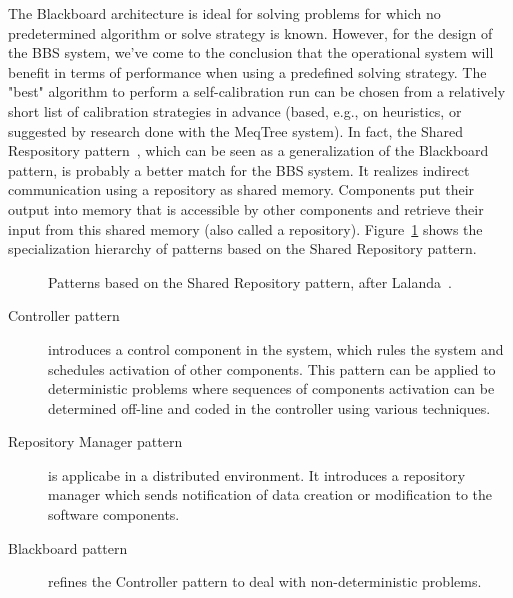 \documentclass[10pt]{lofar}
\newcommand{\meqtree}{MeqTree\xspace}
\begin{document}
The Blackboard architecture is ideal for solving problems for which no
predetermined algorithm or solve strategy is known. However, for the design of
the BBS system, we've come to the conclusion that the operational system will
benefit in terms of performance when using a predefined solving strategy. The
"best" algorithm to perform a self-calibration run can be chosen from a
relatively short list of calibration strategies in advance (based, e.g., on
heuristics, or suggested by research done with the \meqtree system).  In fact,
the Shared Respository pattern~\cite{Lalanda1998}, which can be seen as a
generalization of the Blackboard pattern, is probably a better match for the
BBS system. It realizes indirect communication using a repository as shared
memory. Components put their output into memory that is accessible by other
components and retrieve their input from this shared memory (also called a
repository). Figure~\ref{fig:shared-repository-pattern} shows the
specialization hierarchy of patterns based on the Shared Repository pattern.

\begin{figure}[!ht]
\centering
{}
\caption{Patterns based on the Shared Repository pattern, after
Lalanda~\cite{Lalanda1998}.}
\label{fig:shared-repository-pattern}
\end{figure}

\begin{description}
\item [Controller pattern] introduces a control component in the system, which
rules the system and schedules activation of other components. This pattern
can be applied to deterministic problems where sequences of components
activation can be determined off-line and coded in the controller using
various techniques.
\item[Repository Manager pattern] is applicabe in a distributed
environment. It introduces a repository manager which sends notification of
data creation or modification to the software components.
\item[Blackboard pattern] refines the Controller pattern to deal with
non-deterministic problems.
\end{description}
\end{document}
